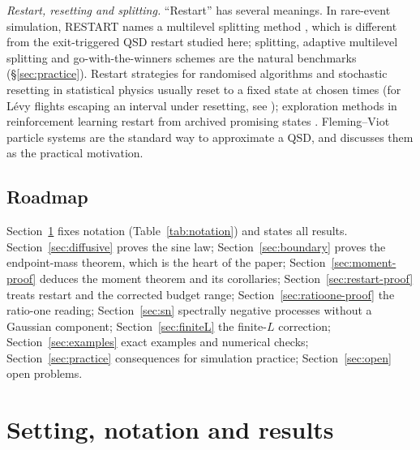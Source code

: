 \documentclass[11pt,a4paper]{article}
\theoremstyle{definition}
\theoremstyle{remark}
\newcommand{\1}{\mathbf 1}
\begin{document}
\emph{Restart, resetting and splitting.} ``Restart'' has several meanings. In rare-event simulation, RESTART names a multilevel splitting method \cite{villen}, which is different from the exit-triggered QSD restart studied here; splitting, adaptive multilevel splitting and go-with-the-winners schemes \cite{ghsz,cerougu,cdgr,aldousvaz} are the natural benchmarks (\S\ref{sec:practice}). Restart strategies for randomised algorithms \cite{lsz} and stochastic resetting in statistical physics \cite{evansmaj,palreuveni} usually reset to a fixed state at chosen times (for L\'evy flights escaping an interval under resetting, see \cite{zbik}); exploration methods in reinforcement learning restart from archived promising states \cite{goexplore}. Fleming--Viot particle systems \cite{bhm,ferrarimaric,villemonais14,afg,cdgrfv} are the standard way to approximate a QSD, and \cite{garcia} discusses them as the practical motivation.


\subsection{Roadmap}
Section~\ref{sec:results} fixes notation (Table~\ref{tab:notation}) and states all results. Section~\ref{sec:diffusive} proves the sine law; Section~\ref{sec:boundary} proves the endpoint-mass theorem, which is the heart of the paper; Section~\ref{sec:moment-proof} deduces the moment theorem and its corollaries; Section~\ref{sec:restart-proof} treats restart and the corrected budget range; Section~\ref{sec:ratioone-proof} the ratio-one reading; Section~\ref{sec:sn} spectrally negative processes without a Gaussian component; Section~\ref{sec:finiteL} the finite-$L$ correction; Section~\ref{sec:examples} exact examples and numerical checks; Section~\ref{sec:practice} consequences for simulation practice; Section~\ref{sec:open} open problems.

\section{Setting, notation and results}\label{sec:results}
\end{document}
